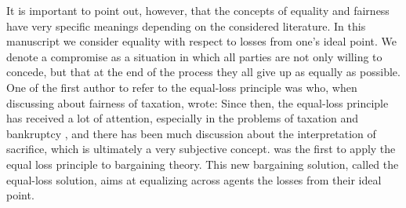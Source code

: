 It is important to point out, however, that the concepts of equality and fairness have very specific meanings depending on the considered literature. 
In this manuscript we consider equality with respect to losses from one's ideal point. 
We denote a compromise as a situation in which all parties are not only willing to concede, but that at the end of the process they all give up as equally as possible. 
One of the first author to refer to the equal-loss principle was \citet[p. 396]{Mill1849} who, when discussing about  fairness of taxation, wrote: \textit{} 
Since then, the equal-loss principle has received a lot of attention, especially in the problems of taxation \citep{Edgeworth1897,Young1987} and bankruptcy \citep{Herrero2001, Aumann1985}, and there has been much discussion about the interpretation of sacrifice, which is ultimately a very subjective concept. \citet{Chun1988} was the first to apply the equal loss principle to bargaining theory. This new bargaining solution, called the equal-loss solution, aims at equalizing across agents the losses from their ideal point.

